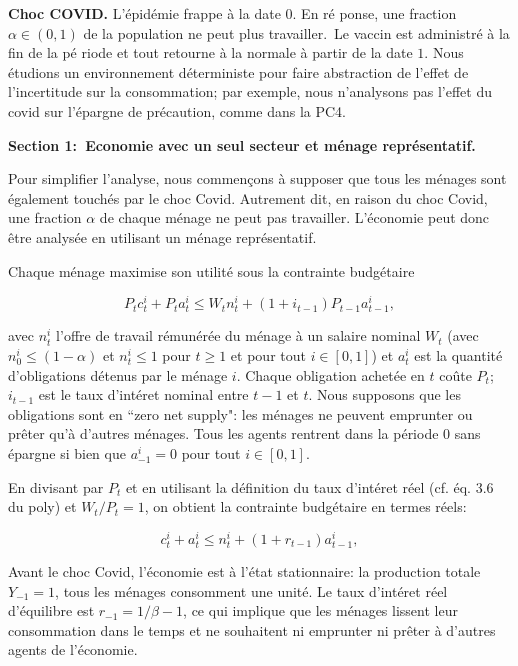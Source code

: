 \documentclass[11pt,a4paper]{article}
\begin{document}
\bigskip

\textbf{Choc COVID.} L'\'{e}pid\'{e}mie frappe \`{a} la date $0.$ En r\'{e}%
ponse, une fraction $\alpha \in \left( 0,1\right) $ de la population ne peut
plus travailler.\ Le vaccin est administr\'{e} \`{a} la fin de la p\'{e}%
riode et tout retourne \`{a} la normale \`{a} partir de la date $1$. Nous \'{e}tudions un environnement d\'{e}terministe  pour faire abstraction de l'effet de l'incertitude sur la consommation; par exemple, nous n'analysons pas l'effet du covid sur l'\'{e}pargne de pr\'{e}caution, comme dans la PC4.


\bigskip

\textbf{Section 1:\ Economie avec un seul secteur et m\'{e}nage repr\'{e}sentatif.%
}

Pour simplifier l'analyse, nous commençons  \`{a} supposer que tous les m\'{e}nages sont \'{e}galement touch\'{e}s par le choc Covid. Autrement dit, en raison du choc Covid, une fraction $ \alpha $ de chaque m\'{e}nage ne peut pas travailler. L'\'{e}conomie peut donc
\^{e}tre analys\'{e}e en utilisant un m\'{e}nage repr\'{e}sentatif. 

Chaque
m\'{e}nage maximise son utilit\'{e} sous la contrainte budg\'{e}taire%

\[
P_tc_{t}^{i}+P_ta_{t}^{i}\leq W_t n_{t}^{i}+(1+i_{t-1})P_{t-1}a_{t-1}^{i}, 
\]%

avec  $n_{t}^{i}$ l'offre de travail r\'{e}mun\'{e}r\'{e}e  du m\'{e}nage \`{a} un salaire nominal $W_t$ (avec $n^i_0 \leq (1-\alpha)$ et $n^i_t \leq  1 $ pour $t\geq 1$ et pour tout $i \in[0,1]$) et $a_{t}^{i}$ est la quantit\'{e} d'obligations d\'{e}tenus par le m\'{e}nage
$i$. Chaque obligation achet\'{e}e en $t$ co\^{u}te $ P_t $; $ i_ {t-1} $ est le taux d'int\'{e}ret nominal entre $t-1$ et $t$. Nous supposons que les obligations sont en ``zero net supply":  les m\'{e}nages ne peuvent emprunter ou pr\^{e}ter qu'\`{a} d'autres m\'{e}nages. Tous les agents rentrent dans la p\'{e}riode $0$ sans \'{e}pargne si bien
que $a_{-1}^{i}=0$ pour tout $i\in \left[ 0,1\right] .$ 

En divisant par $ P_t $ et en utilisant la d\'{e}finition du taux d'int\'{e}ret r\'{e}el (cf. \'{e}q. 3.6 du poly) et $ W_t / P_t = 1 $, on obtient la contrainte budg\'{e}taire en termes r\'{e}els:

\[
c_{t}^{i}+a_{t}^{i}\leq n_{t}^{i}+(1+r_{t-1})a_{t-1}^{i}, 
\]%

Avant le choc Covid, l'\'{e}conomie est \`{a} l'\'{e}tat stationnaire: la production totale $ Y_{-1} = 1 $, tous les m\'{e}nages consomment une unit\'{e}. Le taux d'int\'{e}ret r\'{e}el d'\'{e}quilibre est $ r_{-1} = 1 /\beta -1 $, ce qui implique que les m\'{e}nages lissent leur consommation dans le temps et ne souhaitent ni emprunter ni pr\^{e}ter \`{a} d'autres agents de l'\'{e}conomie.
\end{document}
